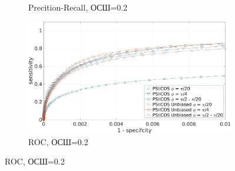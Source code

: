 \documentclass[12pt]{beamer}
\begin{document}
\begin{frame}[t]
\begin{figure}[htbp]
\begin{subfigure}[t]{0.49\textwidth}
            \caption{\tiny Precition-Recall, ОСШ=0.2}\label{fig:psiicos_vs_unbiased_3_ntw_c}
        \end{subfigure}
        \begin{subfigure}[t]{0.49\textwidth}
            \includegraphics[width=0.99\linewidth]{../images/roc_3_ntw_snr_02.jpg}
            \caption{\tiny ROC, ОСШ=0.2}\label{fig:psiicos_vs_unbiased_3_ntw_d}
        \end{subfigure}
    \end{figure}
\end{frame}
\end{document}
